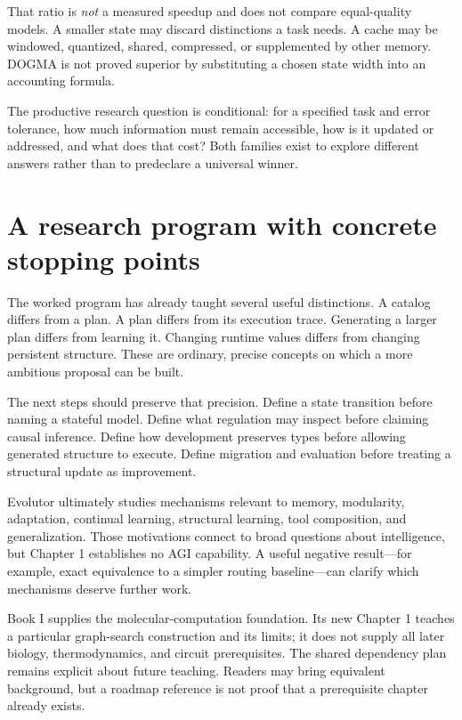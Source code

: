 That ratio is \emph{not} a measured speedup and does not compare equal-quality models. A smaller state may discard distinctions a task needs. A cache may be windowed, quantized, shared, compressed, or supplemented by other memory. DOGMA is not proved superior by substituting a chosen state width into an accounting formula.

The productive research question is conditional: for a specified task and error tolerance, how much information must remain accessible, how is it updated or addressed, and what does that cost? Both families exist to explore different answers rather than to predeclare a universal winner.

\section{A research program with concrete stopping points}\label{sec:roadmap}
The worked program has already taught several useful distinctions. A catalog differs from a plan. A plan differs from its execution trace. Generating a larger plan differs from learning it. Changing runtime values differs from changing persistent structure. These are ordinary, precise concepts on which a more ambitious proposal can be built.


The next steps should preserve that precision. Define a state transition before naming a stateful model. Define what regulation may inspect before claiming causal inference. Define how development preserves types before allowing generated structure to execute. Define migration and evaluation before treating a structural update as improvement.

Evolutor ultimately studies mechanisms relevant to memory, modularity, adaptation, continual learning, structural learning, tool composition, and generalization. Those motivations connect to broad questions about intelligence, but Chapter 1 establishes no AGI capability. A useful negative result---for example, exact equivalence to a simpler routing baseline---can clarify which mechanisms deserve further work.

Book I supplies the molecular-computation foundation. Its new Chapter 1 teaches a particular graph-search construction and its limits; it does not supply all later biology, thermodynamics, and circuit prerequisites. The shared dependency plan remains explicit about future teaching. Readers may bring equivalent background, but a roadmap reference is not proof that a prerequisite chapter already exists.

